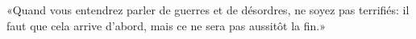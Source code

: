 \encetemps \jesusdisciples
	«Quand vous entendrez parler de guerres et de désordres,
	ne soyez pas terrifiés:
	il faut que cela arrive d’abord, mais ce ne sera pas aussitôt la fin.»
